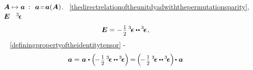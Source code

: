 ~${\hspace{-0.2ex}\bm{A} \mapsto \bm{a}\:: \hspace{.4em} \bm{a} \narroweq \bm{a}(\bm{A})}$.
~\eqref{thedirectrelationoftheunitdyadwiththepermutationsparity},
~${\hspace{-0.1ex}\bm{E}}$
~${\hspace{-0.1ex}{^3\hspace{-0.25ex}\bm{\epsilon}}\hspace{.05ex}}$
%
\begin{equation*}
\UnitDyad = - \hspace{.2ex} \smalldisplaystyleonehalf \hspace{.4ex} \permutationsparitytensor \dotdotp \hspace{-0.1ex} \permutationsparitytensor
\hspace{.2ex} ,
\end{equation*}
%
~
~\eqref{definingpropertyoftheidentitytensor}
\hbox{\hspace{-0.2ex}\inquotes{${\dotp\hspace{.22ex}}$}\hspace{-0.2ex}-}
%
\begin{equation*}
\bm{a}
= \hspace{.1ex}
\tikzmark{beginUnitTensorViaPermutationsParityIsNeutralOnTheRightSide}
\bm{a} \hspace{.1ex} \dotp \left( \hspace{-0.3ex} - \hspace{.2ex} \smalldisplaystyleonehalf \hspace{.4ex} \permutationsparitytensor \dotdotp \hspace{-0.1ex} \permutationsparitytensor \right)
\hspace{-0.6ex} \tikzmark{endUnitTensorViaPermutationsParityIsNeutralOnTheRightSide}
=
\tikzmark{beginUnitTensorViaPermutationsParityIsNeutralOnTheLeftSide} \hspace{-0.6ex}
\left( \hspace{-0.3ex} - \hspace{.2ex} \smalldisplaystyleonehalf \hspace{.4ex} \permutationsparitytensor \dotdotp \hspace{-0.1ex} \permutationsparitytensor \right) \hspace{-0.3ex} \dotp \hspace{.1ex} \bm{a}
\tikzmark{endUnitTensorViaPermutationsParityIsNeutralOnTheLeftSide}
\end{equation*}%
